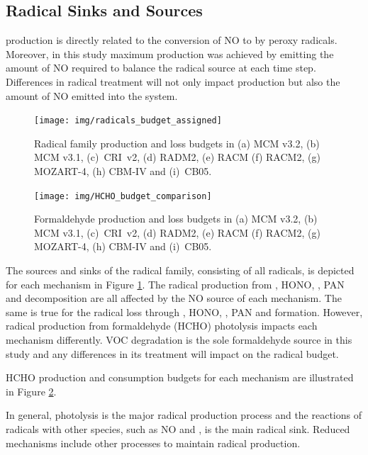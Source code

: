 \subsection{Radical Sinks and Sources} \label{ss:radicals}

 production is directly related to the conversion of NO to  by peroxy radicals. 
Moreover, in this study maximum  production was achieved by emitting the amount of NO required to balance the radical source at each time step. 
Differences in radical treatment will not only impact  production but also the amount of NO emitted into the system.

\begin{figure}
    \begin{center}
        \texttt{[image: img/radicals\_budget\_assigned]}
    \end{center}
    \caption{Radical family production and loss budgets in (a) MCM v3.2, (b) MCM v3.1, \mbox{(c) CRI v2}, (d) RADM2, (e) RACM (f) RACM2, (g) MOZART-4, (h) CBM-IV and \mbox{(i) CB05}.}
    \label{f:radical_budgets} 
\end{figure} 

\begin{figure}
    \begin{center}
        \texttt{[image: img/HCHO\_budget\_comparison]}
    \end{center}
    \caption{Formaldehyde production and loss budgets in (a) MCM v3.2, (b) MCM v3.1, \mbox{(c) CRI v2}, (d) RADM2, (e) RACM (f) RACM2, (g) MOZART-4, (h) CBM-IV and \mbox{(i) CB05}.}
    \label{f:HCHO_budgets} 
\end{figure} 

The sources and sinks of the radical family, consisting of all radicals, is depicted for each mechanism in Figure \ref{f:radical_budgets}.
The radical production from , HONO, , PAN and  decomposition are all affected by the NO source of each mechanism.
The same is true for the radical loss through , HONO, , PAN and  formation.
However, radical production from formaldehyde (HCHO) photolysis impacts each mechanism differently.
VOC degradation is the sole formaldehyde source in this study and any differences in its treatment will impact on the radical budget.

HCHO production and consumption budgets for each mechanism are illustrated in Figure \ref{f:HCHO_budgets}.

In general, photolysis is the major radical production process and the reactions of radicals with other species, such as NO and , is the main radical sink. 
Reduced mechanisms include other processes to maintain radical production.

